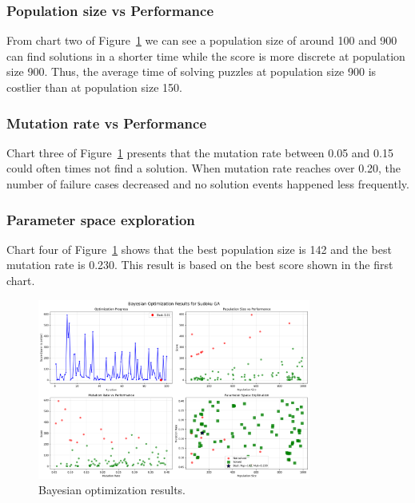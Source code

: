 \subsubsection{Population size vs Performance}

From chart two of Figure~\ref{fig:bayesian_optimization_results} we can see a population size of around 100 and 900 can find solutions in a shorter time while the score is more discrete at population size 900. Thus, the average time of solving puzzles at population size 900 is costlier than at population size 150.

\subsubsection{Mutation rate vs Performance}

Chart three of Figure~\ref{fig:bayesian_optimization_results} presents that the mutation rate between 0.05 and 0.15 could often times not find a solution. When mutation rate reaches over 0.20, the number of failure cases decreased and no solution events happened less frequently.

\subsubsection{Parameter space exploration}

Chart four of Figure~\ref{fig:bayesian_optimization_results} shows that the best population size is 142 and the best mutation rate is 0.230. This result is based on the best score shown in the first chart.

\begin{figure}[H]
\centering
\includegraphics[width=0.8\textwidth]{resources/bayesian_optimization_results.png}
\caption{Bayesian optimization results.}
\label{fig:bayesian_optimization_results}
\end{figure}

